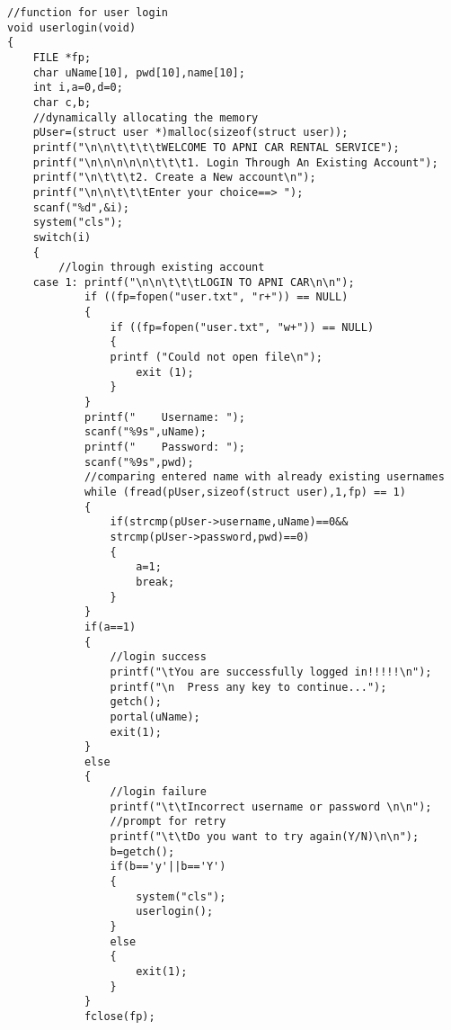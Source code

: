 \documentclass[12pt]{article}
\begin{document}
\begin{lstlisting}
//function for user login
void userlogin(void)
{
    FILE *fp;
    char uName[10], pwd[10],name[10];
    int i,a=0,d=0;
    char c,b;
    //dynamically allocating the memory
    pUser=(struct user *)malloc(sizeof(struct user));  
    printf("\n\n\t\t\t\tWELCOME TO APNI CAR RENTAL SERVICE");
    printf("\n\n\n\n\n\t\t\t1. Login Through An Existing Account");
    printf("\n\t\t\t2. Create a New account\n");
    printf("\n\n\t\t\tEnter your choice==> ");
    scanf("%d",&i);
    system("cls");
    switch(i)
    {
        //login through existing account
    case 1: printf("\n\n\t\t\tLOGIN TO APNI CAR\n\n");    
            if ((fp=fopen("user.txt", "r+")) == NULL)
            {
                if ((fp=fopen("user.txt", "w+")) == NULL)
                {
            	printf ("Could not open file\n");
                    exit (1);
                }
            }
            printf("	Username: ");
            scanf("%9s",uName);
            printf("	Password: ");
            scanf("%9s",pwd);
            //comparing entered name with already existing usernames
            while (fread(pUser,sizeof(struct user),1,fp) == 1)
            {
                if(strcmp(pUser->username,uName)==0&&
                strcmp(pUser->password,pwd)==0)
                {
                    a=1;
                    break;
                }
            }
            if(a==1)
            {
                //login success
                printf("\tYou are successfully logged in!!!!!\n");
                printf("\n	Press any key to continue...");
                getch();
                portal(uName);
                exit(1);
            }
            else
            {
                //login failure
                printf("\t\tIncorrect username or password \n\n");
                //prompt for retry
                printf("\t\tDo you want to try again(Y/N)\n\n");  
                b=getch();
                if(b=='y'||b=='Y')
                {
                    system("cls");
                    userlogin();
                }
                else
                {
                    exit(1);
                }
            }
            fclose(fp);


\end{lstlisting}
\end{document}

